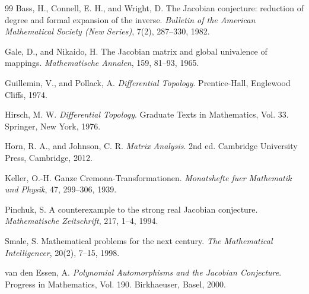 \documentclass[a4paper,11pt]{article}
\theoremstyle{plain}
\theoremstyle{definition}
\theoremstyle{remark}
\begin{document}
\begin{thebibliography}{99}
	 Bass, H., Connell, E. H., and Wright, D. The Jacobian conjecture: reduction of degree and formal expansion of the inverse. \emph{Bulletin of the American Mathematical Society (New Series)}, 7(2), 287--330, 1982.
	
	 Gale, D., and Nikaido, H. The Jacobian matrix and global univalence of mappings. \emph{Mathematische Annalen}, 159, 81--93, 1965.
	
	 Guillemin, V., and Pollack, A. \emph{Differential Topology}. Prentice-Hall, Englewood Cliffs, 1974.
	
	 Hirsch, M. W. \emph{Differential Topology}. Graduate Texts in Mathematics, Vol. 33. Springer, New York, 1976.
	
	 Horn, R. A., and Johnson, C. R. \emph{Matrix Analysis}. 2nd ed. Cambridge University Press, Cambridge, 2012.
	
	 Keller, O.-H. Ganze Cremona-Transformationen. \emph{Monatshefte fuer Mathematik und Physik}, 47, 299--306, 1939.
	
	 Pinchuk, S. A counterexample to the strong real Jacobian conjecture. \emph{Mathematische Zeitschrift}, 217, 1--4, 1994.
	
	 Smale, S. Mathematical problems for the next century. \emph{The Mathematical Intelligencer}, 20(2), 7--15, 1998.
	
	 van den Essen, A. \emph{Polynomial Automorphisms and the Jacobian Conjecture}. Progress in Mathematics, Vol. 190. Birkhaeuser, Basel, 2000.
\end{thebibliography}
\end{document}
